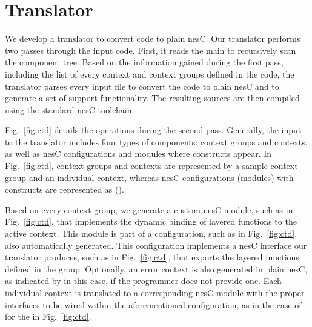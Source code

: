  \section{Translator}\label{sec:translator}

 We develop a translator to convert \conesc code to plain nesC. Our
 translator performs two passes through the input code. First, it
 reads the main  to recursively scan the component
 tree. Based on the information gained during the first pass,
 including the list of every context and context groups defined in the
 code, the translator parses every input file to convert the \conesc code to plain
 nesC and to generate a set of support functionality. The resulting
 sources are then compiled using the standard nesC toolchain.


Fig.~\ref{fig:ctd} details the operations during the second
pass. Generally, the input to the translator includes four types of
components: context groups and contexts, as well as nesC
configurations and modules where \conesc constructs appear.  In
Fig.~\ref{fig:ctd}, context groups and contexts are represented by a
sample  context group and an individual 
context, whereas nesC configurations (modules) with \conesc
constructs are represented as  ().

Based on every context group, we generate a custom nesC module, such
as  in Fig.~\ref{fig:ctd}, that implements the
dynamic binding of layered functions to the active context. This
module is part of a configuration, such as  in
Fig.~\ref{fig:ctd}, also automatically generated. This configuration
implements a nesC interface our translator produces, such as
 in Fig.~\ref{fig:ctd}, that exports the layered
functions defined in the group. Optionally, an error context is also
generated in plain nesC, as indicated by  in this
case, if the programmer does not provide one. Each individual context
is translated to a corresponding nesC module with the proper
interfaces to be wired within the aforementioned configuration, as in
the case of  for the  in
Fig.~\ref{fig:ctd}.

